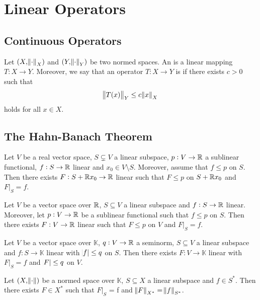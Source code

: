 \section{Linear Operators}
\subsection{Continuous Operators}
\begin{definition}
	Let $(X,\norm{\cdot}_X)$ and $(Y,\norm{\cdot}_Y)$ be two normed spaces. An  is a linear mapping $T : X \to Y$. Moreover, we say that an operator $T : X \to Y$ is  if there exists $c > 0$ such that 
	\begin{equation}
		\norm{T(x)}_Y \leq c\norm{x}_X
	\end{equation}
	\noindent holds for all $x \in X$.
\end{definition}

\subsection{The Hahn-Banach Theorem}

\begin{lemma}
	Let $V$ be a real vector space, $S \subsetneq V$ a linear subspace, $p : V \to \mathbb{R}$ a sublinear functional, $f : S \to \mathbb{R}$ linear and $x_0 \in V \setminus S$. Moreover, assume that $f \leq p$ on $S$. Then there exists $F : S + \mathbb{R} x_0 \to \mathbb{R}$ linear such that $F \leq p$ on $S + \mathbb{R} x_0$ and $F\vert_S = f$.
\end{lemma}

\begin{theorem}
	Let $V$ be a vector space over $\mathbb{R}$, $S \subseteq V$ a linear subspace and $f : S \to \mathbb{R}$ linear. Moreover, let $p : V \to \mathbb{R}$ be a sublinear functional such that $f \leq p$ on $S$. Then there exists $F : V \to \mathbb{R}$ linear such that $F \leq p$ on $V$ and $F\vert_S = f$.	
\end{theorem}

\begin{theorem}
	Let $V$ be a vector space over $\mathbb{K}$, $q : V \to \mathbb{R}$ a seminorm, $S \subseteq V$ a linear subspace and $f : S \to \mathbb{K}$ linear with $\abs{f} \leq q$ on $S$. Then there exists $F : V \to \mathbb{K}$ linear with $F \vert_S = f$ and $\abs{F} \leq q$ on $V$.		
\end{theorem}

\begin{corollary}[Extension]
	Let $(X,\norm{\cdot})$ be a normed space over $\mathbb{K}$, $S \subseteq X$ a linear subspace and $f \in S^*$. Then there exists $F \in X^*$ such that $F\vert_S$ = f and $\norm{F}_{X^*} = \norm{f}_{S^*}$.
\end{corollary}

